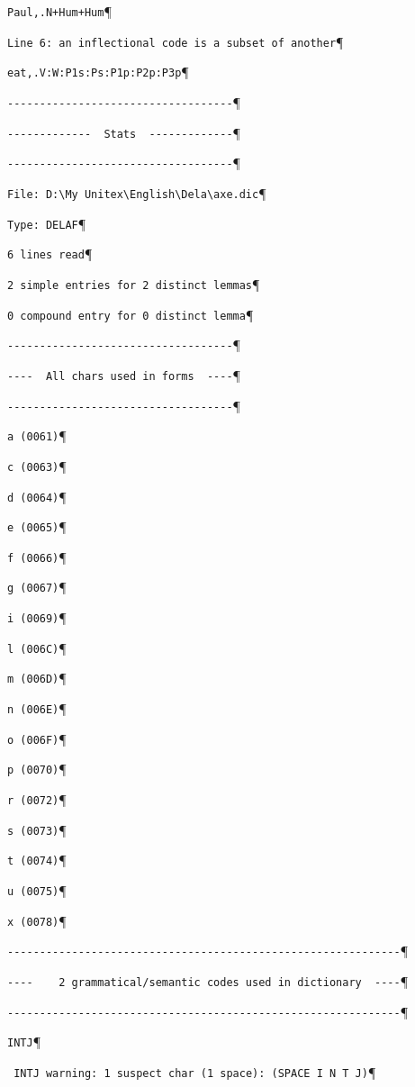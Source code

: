 \verb$Paul,.N+Hum+Hum$\P

\verb$Line 6: an inflectional code is a subset of another$\P

\verb$eat,.V:W:P1s:Ps:P1p:P2p:P3p$\P

\verb$-----------------------------------$\P

\verb$-------------  Stats  -------------$\P

\verb$-----------------------------------$\P

\verb$File: D:\My Unitex\English\Dela\axe.dic$\P

\verb$Type: DELAF$\P

\verb$6 lines read$\P

\verb$2 simple entries for 2 distinct lemmas$\P

\verb$0 compound entry for 0 distinct lemma$\P

\verb$-----------------------------------$\P

\verb$----  All chars used in forms  ----$\P

\verb$-----------------------------------$\P

\verb$a (0061)$\P

\verb$c (0063)$\P

\verb$d (0064)$\P

\verb$e (0065)$\P

\verb$f (0066)$\P

\verb$g (0067)$\P

\verb$i (0069)$\P

\verb$l (006C)$\P

\verb$m (006D)$\P

\verb$n (006E)$\P

\verb$o (006F)$\P

\verb$p (0070)$\P

\verb$r (0072)$\P

\verb$s (0073)$\P

\verb$t (0074)$\P

\verb$u (0075)$\P

\verb$x (0078)$\P

\verb$-------------------------------------------------------------$\P

\verb$----    2 grammatical/semantic codes used in dictionary  ----$\P

\verb$-------------------------------------------------------------$\P

\verb$INTJ$\P

\verb$ INTJ warning: 1 suspect char (1 space): (SPACE I N T J)$\P

